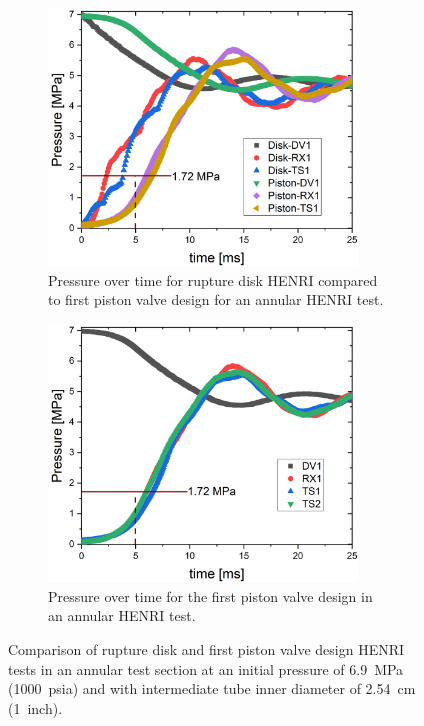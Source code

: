 \begin{figure}[tb]
    \vspace{16pt}
    \centering
    \begin{subfigure}[t]{0.45\textwidth}
        \centering
        \includegraphics[width=0.9\textwidth]{results/plots/1000psi_annular_BD_Piston.png}
        \caption{Pressure over time for rupture disk HENRI compared to first piston valve design for an annular HENRI test.}
        \label{fig:mtm disk}
    \end{subfigure}
    \hfill
    \begin{subfigure}[t]{0.45\textwidth}
        \centering
        \includegraphics[width=0.9\textwidth]{results/plots/1000psi_MtMseal.png}
        \caption{Pressure over time for the first piston valve design in an annular HENRI test.}
        \label{fig:piston metal 1000psi}
    \end{subfigure}
    
    \caption{Comparison of rupture disk and first piston valve design HENRI tests in an annular test section at an initial pressure of \SI{6.9}{\mega\pascal} (\SI{1000}{psia}) and with intermediate tube inner diameter of \SI{2.54}{\centi\meter} (\SI{1}{inch}).}
    \label{fig:piston v disk}
    \vspace{16pt}
\end{figure}


